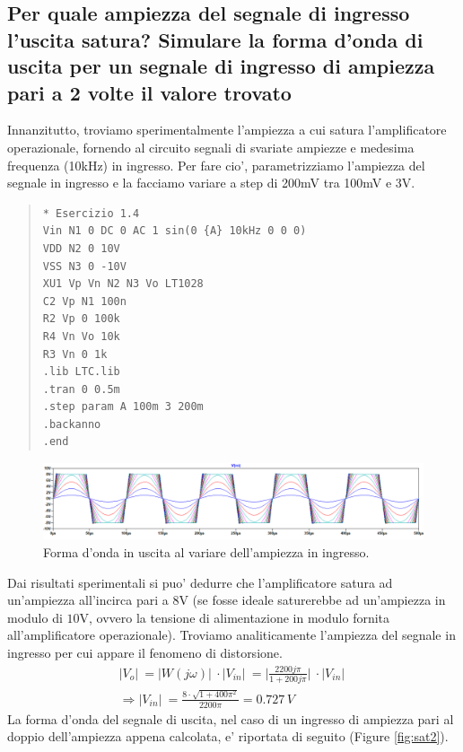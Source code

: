 \documentclass[a4paper,10pt]{article}
\begin{document}
\subsection{Per quale ampiezza del segnale di ingresso l'uscita satura? Simulare la forma  d'onda di uscita per un segnale di ingresso di ampiezza pari a 2 volte il valore trovato}
Innanzitutto, troviamo sperimentalmente l'ampiezza a cui satura l'amplificatore operazionale, fornendo al circuito segnali di svariate ampiezze e medesima frequenza (10kHz) in ingresso. Per fare cio', parametrizziamo l'ampiezza del segnale in ingresso e la facciamo variare a step di 200mV tra 100mV e 3V.
\small
\begin{quote}
\begin{verbatim}
* Esercizio 1.4
Vin N1 0 DC 0 AC 1 sin(0 {A} 10kHz 0 0 0)
VDD N2 0 10V
VSS N3 0 -10V
XU1 Vp Vn N2 N3 Vo LT1028
C2 Vp N1 100n
R2 Vp 0 100k
R4 Vn Vo 10k
R3 Vn 0 1k
.lib LTC.lib
.tran 0 0.5m
.step param A 100m 3 200m
.backanno
.end
\end{verbatim}
\end{quote}
\normalsize
\begin{figure}[h!]
	\centering
 	\includegraphics[width=1\linewidth]{plot1-4-1.png}
  	\caption{Forma d'onda in uscita al variare dell'ampiezza in ingresso.}
  	\label{fig:sat1}
\end{figure}
Dai risultati sperimentali si puo' dedurre che l'amplificatore satura ad un'ampiezza all'incirca pari a $8$V (se fosse ideale saturerebbe ad un'ampiezza in modulo di $10$V, ovvero la tensione di alimentazione in modulo fornita all'amplificatore operazionale). Troviamo analiticamente l'ampiezza del segnale in ingresso per cui appare il fenomeno di distorsione.
\begin{gather*}
	\lvert V_o \rvert\ = \lvert W(j\omega) \rvert\ \cdot \lvert V_{in} \rvert\ = \lvert \frac{2200j\pi}{1+200j\pi} \rvert\ \cdot \lvert V_{in} \rvert\ \\
	\Rightarrow \lvert V_{in} \rvert\ = \frac{8\cdot \sqrt{1+400\pi^2}}{2200\pi} = 0.727\,V
\end{gather*}
La forma d'onda del segnale di uscita, nel caso di un ingresso di ampiezza pari al doppio dell'ampiezza appena calcolata, e' riportata di seguito (Figure \ref{fig:sat2}).
    
\end{document}
